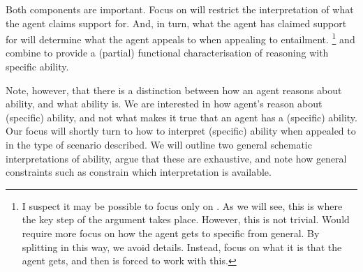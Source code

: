 \begin{note}
  Both components are important.
  Focus on \gsi{} will restrict the interpretation of what the agent claims support for.
  And, in turn, what the agent has claimed support for will determine what the agent appeals to when appealing to  entailment.\nolinebreak
  \footnote{
    I suspect it may be possible to focus only on \gsi{}.
    As we will see, this is where the key step of the argument takes place.
    However, this is not trivial.
    Would require more focus on how the agent gets to specific from general.
    By splitting in this way, we avoid details.
    Instead, focus on what it is that the agent gets, and then  is forced to work with this.
  }
  \gsi{} and  combine to provide a (partial) functional characterisation of reasoning with specific ability.
\end{note}

\begin{note}
  Note, however, that there is a distinction between how an agent reasons about ability, and what ability is.
  We are interested in how agent's reason about (specific) ability, and not what makes it true that an agent has a (specific) ability.
  Our focus will shortly turn to how to interpret (specific) ability when appealed to in the type of scenario described.
  We will outline two general schematic interpretations of ability, argue that these are exhaustive, and note how general constraints such as \ESU{} constrain which interpretation is available.
\end{note}

